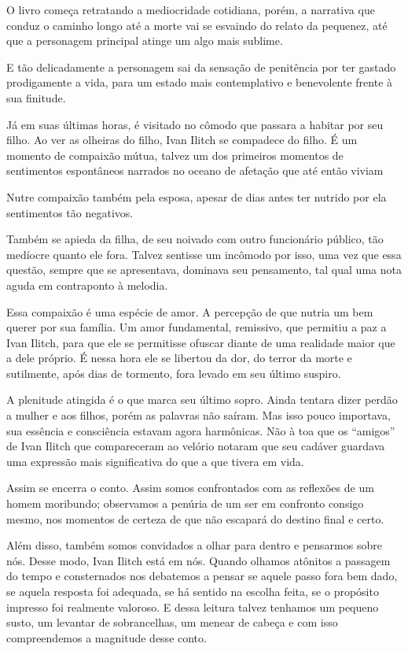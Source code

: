 \documentclass[12pt]{extarticle}
\begin{document}
O livro começa retratando a mediocridade cotidiana, porém, a narrativa
que conduz o caminho longo até a morte vai se esvaindo do relato da
pequenez, até que a personagem principal atinge um algo mais sublime.

E tão delicadamente a personagem sai da sensação de penitência por ter
gastado prodigamente a vida, para um estado mais contemplativo e
benevolente frente à sua finitude.

Já em suas últimas horas, é visitado no cômodo que passara a habitar por
seu filho. Ao ver as olheiras do filho, Ivan Ilitch se compadece do
filho. É um momento de compaixão mútua, talvez um dos primeiros momentos
de sentimentos espontâneos narrados no oceano de afetação que até então
viviam

Nutre compaixão também pela esposa, apesar de dias antes ter nutrido por
ela sentimentos tão negativos.

Também se apieda da filha, de seu noivado com outro funcionário público,
tão medíocre quanto ele fora. Talvez sentisse um incômodo por isso, uma
vez que essa questão, sempre que se apresentava, dominava seu
pensamento, tal qual uma nota aguda em contraponto à melodia.

Essa compaixão é uma espécie de amor. A percepção de que nutria um bem
querer por sua família. Um amor fundamental, remissivo, que permitiu a
paz a Ivan Ilitch, para que ele se permitisse ofuscar diante de uma
realidade maior que a dele próprio. É nessa hora ele se libertou da dor,
do terror da morte e sutilmente, após dias de tormento, fora levado em
seu último suspiro.

A plenitude atingida é o que marca seu último sopro. Ainda tentara dizer
perdão a mulher e aos filhos, porém as palavras não saíram. Mas isso
pouco importava, sua essência e consciência estavam agora harmônicas.
Não à toa que os ``amigos'' de Ivan Ilitch que compareceram ao velório
notaram que seu cadáver guardava uma expressão mais significativa do que
a que tivera em vida.

Assim se encerra o conto. Assim somos confrontados com as reflexões de
um homem moribundo; observamos a penúria de um ser em confronto consigo
mesmo, nos momentos de certeza de que não escapará do destino final e
certo.

Além disso, também somos convidados a olhar para dentro e pensarmos
sobre nós. Desse modo, Ivan Ilitch está em nós. Quando olhamos atônitos
a passagem do tempo e consternados nos debatemos a pensar se aquele
passo fora bem dado, se aquela resposta foi adequada, se há sentido na
escolha feita, se o propósito impresso foi realmente valoroso. E dessa
leitura talvez tenhamos um pequeno susto, um levantar de sobrancelhas,
um menear de cabeça e com isso compreendemos a magnitude desse conto.
\end{document}
